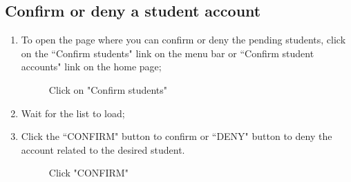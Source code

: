 \documentclass[ManualeUtente]{subfiles}
\begin{document}
	\subsection{Confirm or deny a student account}
	\begin{enumerate}
		\item To open the page where you can confirm or deny the pending students, click on the \textquotedblleft Confirm students" link on the menu bar or \textquotedblleft Confirm student accounts" link on the home page;
		\begin{figure}[H]
			\centering
			\caption{Click on "Confirm students"}
			\label{fig:Click on "Confirm students"}
		\end{figure}
		\item Wait for the list to load;
		\item Click the \textquotedblleft CONFIRM" button to confirm or \textquotedblleft DENY" button to deny the account related to the desired student.
		\begin{figure}[H]
			\centering
			\caption{Click "CONFIRM"}
			\label{fig:Click "CONFIRM"}
		\end{figure}
	\end{enumerate}
	
\end{document}
